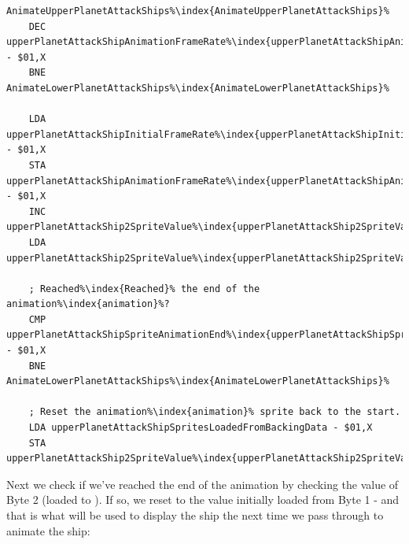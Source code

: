 \begin{lstlisting}[escapechar=\%]
AnimateUpperPlanetAttackShips%\index{AnimateUpperPlanetAttackShips}%   
    DEC upperPlanetAttackShipAnimationFrameRate%\index{upperPlanetAttackShipAnimationFrameRate}% - $01,X
    BNE AnimateLowerPlanetAttackShips%\index{AnimateLowerPlanetAttackShips}%

    LDA upperPlanetAttackShipInitialFrameRate%\index{upperPlanetAttackShipInitialFrameRate}% - $01,X
    STA upperPlanetAttackShipAnimationFrameRate%\index{upperPlanetAttackShipAnimationFrameRate}% - $01,X
    INC upperPlanetAttackShip2SpriteValue%\index{upperPlanetAttackShip2SpriteValue}%,X
    LDA upperPlanetAttackShip2SpriteValue%\index{upperPlanetAttackShip2SpriteValue}%,X

    ; Reached%\index{Reached}% the end of the animation%\index{animation}%?
    CMP upperPlanetAttackShipSpriteAnimationEnd%\index{upperPlanetAttackShipSpriteAnimationEnd}% - $01,X
    BNE AnimateLowerPlanetAttackShips%\index{AnimateLowerPlanetAttackShips}%

    ; Reset the animation%\index{animation}% sprite back to the start.
    LDA upperPlanetAttackShipSpritesLoadedFromBackingData - $01,X
    STA upperPlanetAttackShip2SpriteValue%\index{upperPlanetAttackShip2SpriteValue}%,X
\end{lstlisting}

Next we check if we've reached the end of the animation by checking the value
of Byte 2 (loaded to ).  If so,
we reset  to the value initially
loaded from Byte 1 - and that is what will be used to display the ship the next
time we pass through to animate the ship:

